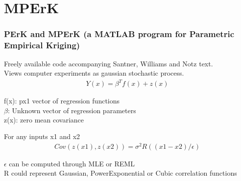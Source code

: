 \documentclass[10pt]{beamer}
\begin{document}
\section{MPErK}
\begin{frame}
\frametitle{PErK and MPErK (a MATLAB program for Parametric Empirical Kriging)}
Freely available code accompanying Santner, Williams and Notz text. \\ Views computer experiments as gaussian stochastic process.\\
\begin{align*}
     Y(x)= \beta^Tf(x) + z(x)   
\end{align*}

\vspace{3mm}

 
f(x): px1 vector of regression functions\\
\(\beta\): Unknown vector of regression parameters\\
z(x): zero mean covariance 

\vspace{2mm}

For any inputs x1 and x2
\begin{align*}
     Cov(z(x1),z(x2))= \sigma^{2}R((x1-x2)/{\epsilon} )   
\end{align*}

\(\epsilon\) can be computed through MLE or REML\\
R could represent Gaussian, PowerExponential or Cubic correlation functions
\end{frame}

\end{document}

